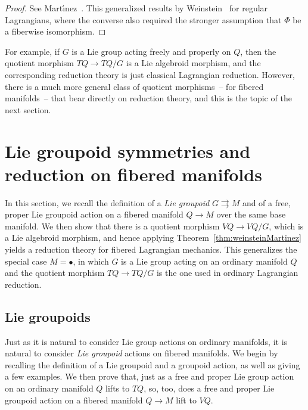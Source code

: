 \documentclass[pdftex]{sigma}
\numberwithin{equation}{section}
\begin{document}
\begin{proof} See Mart\'{\i}nez~\cite[Theorems 5--6]{Martinez2008}. This generalized results by Weinstein~\cite[Theorems~4.8 and~4.5, respectively]{Weinstein1996} for regular Lagrangians, where the converse also required the stronger assumption that $\Phi$ be a f\/iberwise isomorphism.
\end{proof}

For example, if $G$ is a Lie group acting freely and properly on $Q$, then the quotient morphism $ T Q \rightarrow T Q / G $ is a Lie algebroid morphism, and the corresponding reduction theory is just classical Lagrangian reduction. However, there is a much more general class of quotient morphisms~-- for f\/ibered manifolds~-- that bear directly on reduction theory, and this is the topic of the next section.

\section{Lie groupoid symmetries and reduction on f\/ibered manifolds}\label{sec:reduction}

In this section, we recall the def\/inition of a \emph{Lie groupoid} $ G \rightrightarrows M $ and of a free, proper Lie groupoid action on a f\/ibered manifold $ Q \rightarrow M $ over the same base manifold. We then show that there is a quotient morphism $ V Q \rightarrow V Q / G $, which is a Lie algebroid morphism, and hence applying Theorem~\ref{thm:weinsteinMartinez} yields a reduction theory for f\/ibered Lagrangian mechanics. This generalizes the special
case $ M = \bullet $, in which $G$ is a Lie group acting on an ordinary manifold $Q$ and the quotient morphism $ T Q \rightarrow T Q / G $ is the one used in ordinary Lagrangian reduction.

\subsection{Lie groupoids}

Just as it is natural to consider Lie group actions on ordinary manifolds, it is natural to consider \emph{Lie groupoid} actions on f\/ibered manifolds. We begin by recalling the def\/inition of a Lie groupoid and a groupoid action, as well as giving a few examples. We then prove that, just as a free and proper Lie group action on an ordinary manifold $Q$ lifts to $ T Q $, so, too, does a free and proper Lie groupoid action on a f\/ibered manifold $ Q \rightarrow M $
lift to $ V Q $.
\end{document}
